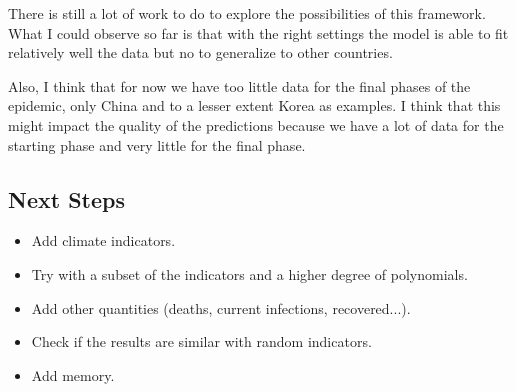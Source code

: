\documentclass[12pt, a4]{article}
\begin{document}
There is still a lot of work to do to explore the possibilities of this framework. 
What I could observe so far is that with the right settings the model is able to fit relatively well the data but no to generalize to other countries.

Also, I think that for now we have too little data for the final phases of the epidemic, only China and to a lesser extent Korea as examples.
I think that this might impact the quality of the predictions because we have a lot of data for the starting phase and very little for the final phase. 

\subsection*{Next Steps}

\begin{itemize}
  \item Add climate indicators.
  \item Try with a subset of the indicators and a higher degree of polynomials.
  \item Add other quantities (deaths, current infections, recovered...).
  \item Check if the results are similar with random indicators. 
  \item Add memory.
\end{itemize}

 

\end{document}
